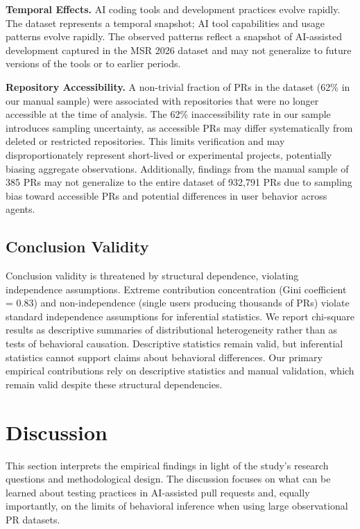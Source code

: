 \documentclass[conference]{IEEEtran}
\begin{document}
\textbf{Temporal Effects.} AI coding tools and development practices evolve rapidly. The dataset represents a temporal snapshot; AI tool capabilities and usage patterns evolve rapidly. The observed patterns reflect a snapshot of AI-assisted development captured in the MSR 2026 dataset and may not generalize to future versions of the tools or to earlier periods.

\textbf{Repository Accessibility.} A non-trivial fraction of PRs in the dataset (62\% in our manual sample) were associated with repositories that were no longer accessible at the time of analysis. The 62\% inaccessibility rate in our sample introduces sampling uncertainty, as accessible PRs may differ systematically from deleted or restricted repositories. This limits verification and may disproportionately represent short-lived or experimental projects, potentially biasing aggregate observations. Additionally, findings from the manual sample of 385 PRs may not generalize to the entire dataset of 932,791 PRs due to sampling bias toward accessible PRs and potential differences in user behavior across agents.

\subsection{Conclusion Validity}

Conclusion validity is threatened by structural dependence, violating independence assumptions. Extreme contribution concentration (Gini coefficient = 0.83) and non-independence (single users producing thousands of PRs) violate standard independence assumptions for inferential statistics. We report chi-square results as descriptive summaries of distributional heterogeneity rather than as tests of behavioral causation. Descriptive statistics remain valid, but inferential statistics cannot support claims about behavioral differences. Our primary empirical contributions rely on descriptive statistics and manual validation, which remain valid despite these structural dependencies.

\section{Discussion}

This section interprets the empirical findings in light of the study's research questions and methodological design. The discussion focuses on what can be learned about testing practices in AI-assisted pull requests and, equally importantly, on the limits of behavioral inference when using large observational PR datasets.
\end{document}
